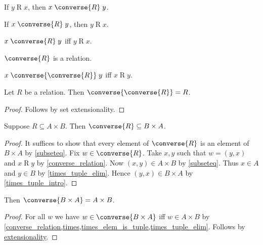 \begin{proposition}\label{converse_intro}
    If $y\mathrel{R} x$, then $x\mathrel{\converse{R}} y$.
\end{proposition}

\begin{proposition}\label{converse_elim}
    If $x\mathrel{\converse{R}} y$, then $y\mathrel{R} x$.
\end{proposition}

\begin{proposition}\label{converse_iff}
    $x\mathrel{\converse{R}} y$ iff $y\mathrel{R} x$.
\end{proposition}


\begin{proposition}\label{converse_is_relation}
    $\converse{R}$ is a relation.
\end{proposition}


\begin{proposition}\label{converse_converse_iff}
    $x \mathrel{\converse{\converse{R}}} y$ iff $x\mathrel{R} y$.
\end{proposition}

\begin{proposition}\label{converse_converse_eq}
    Let $R$ be a relation.
    Then $\converse{\converse{R}} = R$.
\end{proposition}
\begin{proof}
    Follows by set extensionality.
\end{proof}

\begin{proposition}\label{converse_type}
    Suppose $R\subseteq A\times B$.
    Then $\converse{R}\subseteq B\times A$.
\end{proposition}
\begin{proof}
    It suffices to show that every element of $\converse{R}$ is an element of $B\times A$
        by \cref{subseteq}.
    Fix $w\in\converse{R}$.
    Take $x, y$ such that $w = (y, x)$ and $x\mathrel{R} y$ by \cref{converse_relation}.
    Now $(x,y)\in A\times B$ by \cref{subseteq}.
    Thus $x\in A$ and $y\in B$ by \cref{times_tuple_elim}.
    Hence $(y,x)\in B\times A$ by \cref{times_tuple_intro}.
\end{proof}

\begin{proposition}\label{converse_times}
    Then $\converse{B\times A} = A\times B$.
\end{proposition}
\begin{proof}
    For all $w$ we have $w\in\converse{B\times A}$ iff $w\in A\times B$
        by \cref{converse_relation,times,times_elem_is_tuple,times_tuple_elim}.
    Follows by \hyperref[setext]{extensionality}.
\end{proof}

